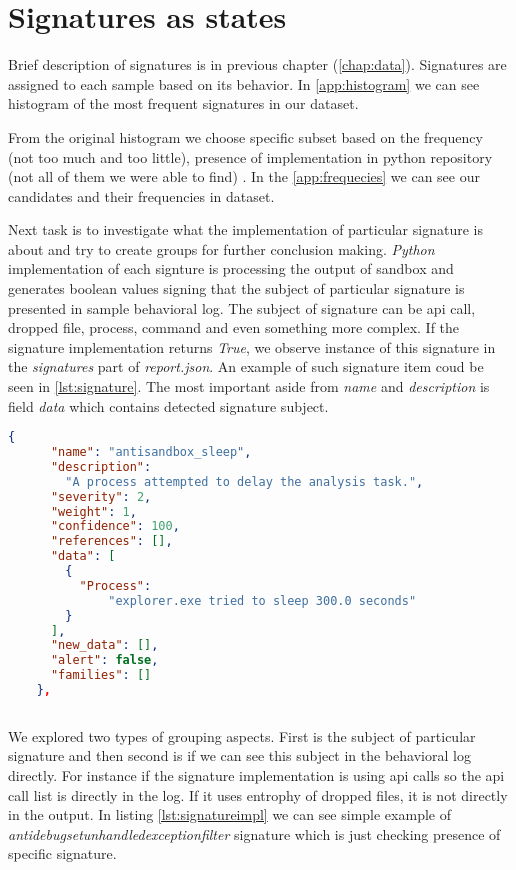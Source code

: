 \section{Signatures as states}
Brief description of signatures is in previous chapter (\ref{chap:data}). Signatures are assigned to each sample based on its behavior. In \ref{app:histogram} we can see histogram of the most frequent signatures in our dataset.

From the original histogram we choose specific subset based on the frequency (not too much and too little), presence of implementation in python repository (not all of them we were able to find) . In the \ref{app:frequecies} we can see our candidates and their frequencies in dataset.

Next task is to investigate what the implementation of particular signature is about and try to create groups for further conclusion making. \emph{Python} implementation of each signture is processing the output of sandbox and generates boolean values signing that the subject of particular signature is presented in sample behavioral log. The subject of signature can be api call, dropped file, process, command and even something more complex. If the signature implementation returns \emph{True}, we observe instance of this signature in the \emph{signatures} part of \emph{report.json}. An example of such signature item coud be seen in \ref{lst:signature}. The most important aside from \emph{name} and \emph{description} is field \emph{data} which contains detected signature subject.

\begin{lstlisting}[language=json, caption={Example of signature item in \emph{report.json}},captionpos=b, label={lst:signature}]
  {
      "name": "antisandbox_sleep",
      "description": 
        "A process attempted to delay the analysis task.",
      "severity": 2,
      "weight": 1,
      "confidence": 100,
      "references": [],
      "data": [
        {
          "Process": 
              "explorer.exe tried to sleep 300.0 seconds"
        }
      ],
      "new_data": [],
      "alert": false,
      "families": []
    },
  
\end{lstlisting}



We explored two types of grouping aspects. First is the subject of particular signature and then second is if we can see this subject in the behavioral log directly. For instance if the signature implementation is using api calls so the api call list is directly in the log. If it uses entrophy of dropped files, it is not directly in the output. In listing \ref{lst:signatureimpl} we can see simple example of \emph{antidebugsetunhandledexceptionfilter} signature which is just checking presence of specific signature.

